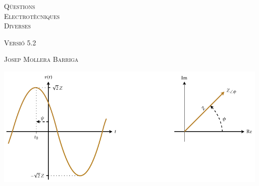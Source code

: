 \begin{titlepage}

   \parbox{18cm}{\fontsize{60pt}{60pt}\selectfont\color{NavyBlue}\scshape%
                 Q\"{u}estions\\[30pt] Electrot\`{e}cniques\\[30pt] Diverses}

   \vspace*{1.8cm}
   {\fontsize{30pt}{30pt}\selectfont\textsc{Versi\'{o} 5.2}}

   \vspace*{2cm}
   {\fontsize{40pt}{40pt}\selectfont\textsc{Josep Mollera Barriga}}

   \vspace*{1.5cm}
   \includegraphics[scale=1.3]{Imatges/Not-Fasor.pdf}

\end{titlepage}
